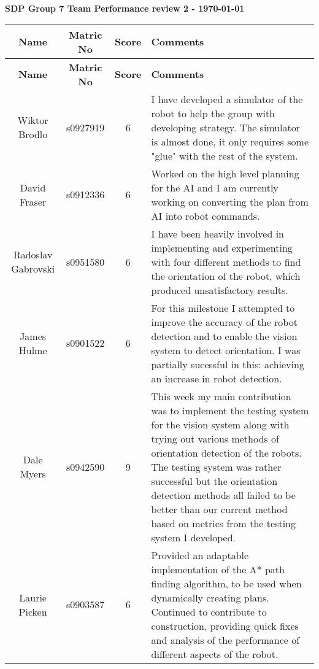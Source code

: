 \documentclass[10pt, a4paper]{article} %
\begin{document}
\textbf{SDP Group 7 Team Performance review 2 - \today}


\begin{longtable}{c c c p{16cm}}
    \textbf{Name} &
    \textbf{Matric No} &
    \textbf{Score} &
    \textbf{Comments}\\
    \hline
    \endfirsthead


    \textbf{Name} &
    \textbf{Matric No} &
    \textbf{Score} &
    \textbf{Comments}\\
    \hline
    \endhead

    Wiktor Brodlo &
    s0927919 &
    6&
    I have developed a simulator of the robot to help the group with developing
    strategy. The simulator is almost done, it only requires some "glue" with
    the rest of the system.\\

    David Fraser &
    s0912336 &
    6&
    Worked on the high level planning for the AI and I am currently working on
    converting the plan from AI into robot commands.\\

    Radoslav Gabrovski &
    s0951580 &
    6& 
    I have been heavily involved in implementing and experimenting with four
    different methods to find the orientation of the robot, which produced
    unsatisfactory results. \\

    James Hulme &
    s0901522 &
    6& 
    For this milestone I attempted to improve the accuracy of the robot
    detection and to enable the vision system to detect orientation. I was
    partially sucessful in this: achieving an increase in robot detection.\\

    Dale Myers &
    s0942590 &
    9&
    This week my main contribution was to implement the testing system for the
    vision system along with trying out various methods of orientation
    detection of the robots. The testing system was rather successful but the
    orientation detection methods all failed to be better than our current
    method based on metrics from the testing system I developed.\\

    Laurie Picken &
    s0903587 &
    6&
    Provided an adaptable implementation of the A* path finding algorithm, to
    be used when dynamically creating plans. Continued to contribute to
    construction, providing quick fixes and analysis of the performance of
    different aspects of the robot.\\


\end{longtable}
\end{document}
